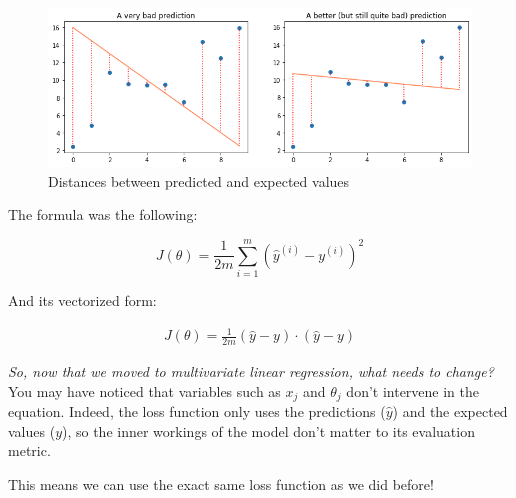 \begin{figure}[!h]
    \centering
    \includegraphics[scale=0.5]{assets/bad_pred_with_distance.png}
    \caption{Distances between predicted and expected values}
\end{figure}

The formula was the following: 

$$
J(\theta) = \frac{1}{2m}\sum_{i=1}^{m}(\hat{y}^{(i)} - y^{(i)})^2
$$

And its vectorized form:

$$
\begin{matrix}
J(\theta) = \frac{1}{2m}(\hat{y} - y)\cdot(\hat{y}- y)
\end{matrix}
$$  

\textit{So, now that we moved to multivariate linear regression, what needs to change?}\newline
You may have noticed that variables such as $x_j$ and $\theta_j$ don't intervene in the equation.
Indeed, the loss function only uses the predictions ($\hat{y}$) and the expected values ($y$), so the inner workings of the model don't matter to its evaluation metric.

This means we can use the exact same loss function as we did before!
